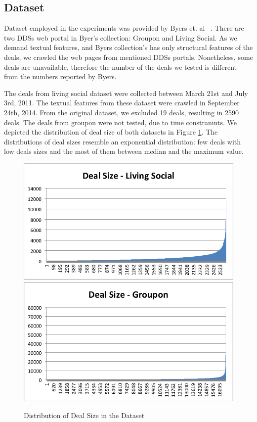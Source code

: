 \documentclass{acm_proc_article-sp}
\begin{document}
\subsection{Dataset}

Dataset employed in the experiments was provided by Byers et. al ~\cite{BMZ12}.
There are two DDSs web portal in Byer's collection: Groupon and Living Social. 
As we demand textual features, and Byers collection's has only structural 
features of the deals, we crawled the web pages from mentioned DDSs portals. 
Nonetheless, some deals are unavailable, therefore the number of the deals 
we tested is different from the numbers reported by Byers.


The deals from living social dataset were collected between March 21st and 
July 3rd, 2011. The textual features from these dataset were crawled in 
September 24th, 2014. From the original dataset, we excluded 19 deals, 
resulting in 2590 deals. The deals from groupon were not tested, due to 
time constranints. We depicted the distribution of deal size of 
both datasets in Figure \ref{dealsize}. The distributions of deal 
sizes resemble an exponential distribution: few deals with low deals sizes 
and the most of them between median and the maximum value.

\begin{figure}[H]
    \centering
    \includegraphics[scale=0.5]{dealsizels.png}
    \includegraphics[scale=0.5]{dealsizegroupon.png}
    \caption{Distribution of Deal Size in the Dataset}
    \label{dealsize}
\end{figure}
\end{document}
